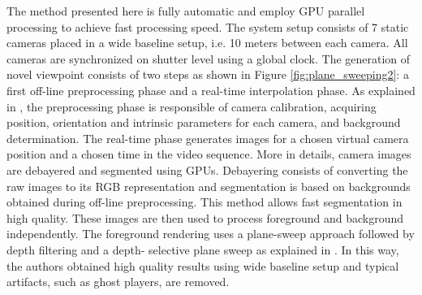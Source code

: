 The method presented here is fully automatic and employ GPU
parallel processing to achieve fast processing speed.
The system setup consists of 7 static cameras placed in a
wide baseline setup, i.e. 10 meters between each camera.
All cameras are synchronized on shutter level using a global clock.
The generation of novel viewpoint consists of two steps as shown in Figure \ref{fig:plane_sweeping2}:
a first off-line preprocessing phase and a real-time interpolation phase. 
As explained in \cite{05_plane_sweeping}, the preprocessing phase is responsible of camera
calibration, acquiring position, orientation and intrinsic parameters for each camera, and background determination. 
The real-time phase generates images for a chosen virtual camera 
position and a chosen time in the video sequence.
More in details, camera images are debayered and segmented using GPUs.
Debayering consists of converting the raw images to its RGB representation and segmentation is based on backgrounds
obtained during off-line preprocessing.
This method \cite{05_plane_sweeping} allows fast segmentation in high quality.
These images are then used to process foreground and background independently. 
The foreground rendering uses a plane-sweep
approach followed by depth filtering and a depth-
selective plane sweep as explained in \cite{05_plane_sweeping}.
In this way, the authors obtained high quality results using wide baseline setup and typical artifacts, such as
ghost players, are removed.
